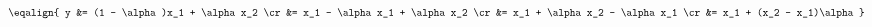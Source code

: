 \hsize 0pt
\vsize 0pt
\nopagenumbers
\overfullrule 0pt
\noindent
$$
\eqalign{
y &= (1 - \alpha)x_1 + \alpha x_2 \cr
  &= x_1 - \alpha x_1 + \alpha x_2 \cr
  &= x_1 + \alpha x_2 - \alpha x_1 \cr
  &= x_1 + (x_2 - x_1)\alpha
}
$$
\bye
